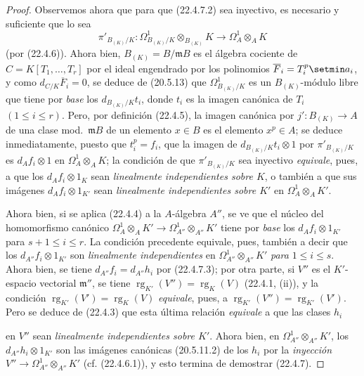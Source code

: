 \begin{proof}
Observemos ahora que para que (22.4.7.2) sea inyectivo, es necesario y suficiente
que lo sea
\[
  \pi'_{B_{(K)}/K}:\Omega^1_{B_{(K)}/K}\otimes_{B_{(K)}}K
  \longrightarrow\Omega^1_A\otimes_AK
\]
(por (22.4.6)). Ahora bien, $B_{(K)}=B/\mathfrak mB$ es el álgebra cociente de
$C=K[T_1,\ldots,T_r]$ por el ideal engendrado por los polinomios
$\overline F_i=T_i^p\setmin a_i$, y como $d_{C/K}\overline F_i=0$, se deduce de
(20.5.13) que $\Omega^1_{B_{(K)}/K}$ es un $B_{(K)}$-módulo libre que tiene por
\emph{base} los $d_{B_{(K)}/K}t_i$, donde $t_i$ es la imagen canónica de $T_i$
$(1\leqslant i\leqslant r)$. Pero, por definición (22.4.5), la imagen canónica por
$j':B_{(K)}\longrightarrow A$ de una clase mod.~$\mathfrak mB$ de un elemento
$x\in B$ es el elemento $x^p\in A$; se deduce inmediatamente, puesto que $t_i^p=f_i$,
que la imagen de $d_{B_{(K)}/K}t_i\otimes1$ por $\pi'_{B_{(K)}/K}$ es
$d_Af_i\otimes1$ en $\Omega^1_A\otimes_AK$; la condición de que
$\pi'_{B_{(K)}/K}$ sea inyectivo \emph{equivale}, pues, a que los
$d_Af_i\otimes1_K$ sean \emph{linealmente independientes sobre $K$}, o también
a que sus imágenes $d_Af_i\otimes1_{K'}$ sean \emph{linealmente independientes
sobre $K'$} en $\Omega^1_A\otimes_AK'$.

Ahora bien, si se aplica (22.4.4) a la $A$-álgebra $A''$, se ve que el núcleo del
homomorfismo canónico
$\Omega^1_A\otimes_AK'\longrightarrow\Omega^1_{A''}\otimes_{A''}K'$ tiene por
\emph{base} los $d_Af_i\otimes1_{K'}$ para $s+1\leqslant i\leqslant r$. La condición
precedente equivale, pues, también a decir que los $d_{A''}f_i\otimes1_{K'}$ son
\emph{linealmente independientes} en $\Omega^1_{A''}\otimes_{A''}K'$ \emph{para}
$1\leqslant i\leqslant s$. Ahora bien, se tiene $d_{A''}f_i=d_{A''}h_i$ por (22.4.7.3);
por otra parte, si $V''$ es el $K'$-espacio vectorial $\mathfrak m''$, se tiene
$\operatorname{rg}_{K'}(V'')=\operatorname{rg}_K(V)$ (22.4.1, (ii)), y la condición
$\operatorname{rg}_{K'}(V')=\operatorname{rg}_K(V)$ \emph{equivale}, pues, a
$\operatorname{rg}_{K'}(V'')=\operatorname{rg}_{K'}(V')$. Pero se deduce de (22.4.3) que esta última
relación \emph{equivale} a que las clases $h_i$


en $V''$ sean \emph{linealmente independientes sobre $K'$}. Ahora bien, en
$\Omega^1_{A''}\otimes_{A''}K'$, los $d_{A''}h_i\otimes1_{K'}$ son las imágenes
canónicas (20.5.11.2) de los $h_i$ por la \emph{inyección}
$V''\longrightarrow\Omega^1_{A''}\otimes_{A''}K'$ (cf. (22.4.6.1)), y esto
termina de demostrar (22.4.7).
\end{proof}


